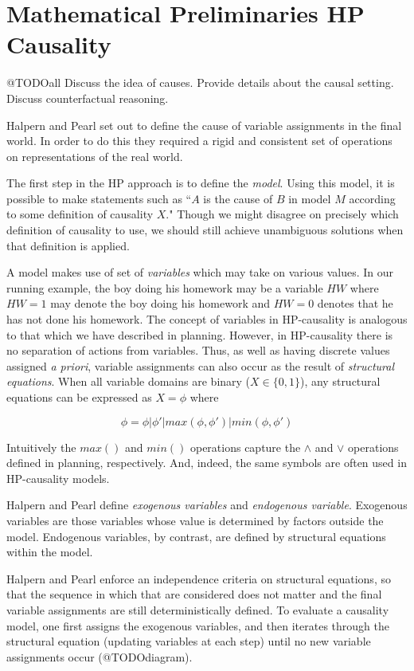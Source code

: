 \documentclass{article}
\theoremstyle{plain}
\theoremstyle{definition}
\begin{document}
\section{Mathematical Preliminaries HP Causality}

@TODOall  Discuss the idea of causes. Provide details about the causal setting. Discuss counterfactual reasoning.

Halpern and Pearl \cite{halpern2005causes} set out to define the cause of variable assignments in the final world. In order to do this they required a rigid and consistent set of operations on representations of the real world.

The first step in the HP approach is to define the \textit{model}. Using this model, it is possible to make statements such as ``$A$ is the cause of $B$ in  model $M$ according to some definition of causality $X$." Though we might disagree on precisely which definition of causality to use, we should still achieve unambiguous solutions when that definition is applied. 

A model makes use of set of \textit{variables} which may take on various values. In our running example, the boy doing his homework may be a variable $HW$ where $HW=1$ may denote the boy doing his homework and $HW=0$ denotes that he has not done his homework. The concept of variables in HP-causality is analogous to that which we have described in planning. However, in HP-causality there is no separation of actions from variables. Thus, as well as having discrete values assigned \textit{a priori}, variable assignments can also occur as the result of \textit{structural equations}. When all variable domains are binary ($X \in \{0,1\}$), any structural equations can be expressed as $X=\phi$ where

\[
\phi= \phi | \phi' | max(\phi, \phi') | min(\phi, \phi') 
\]

Intuitively the $max()$ and $min()$ operations capture the $\land$ and $\lor$ operations defined in planning, respectively. And, indeed, the same symbols are often used in HP-causality models.

Halpern and Pearl define \textit{exogenous variables} and \textit{endogenous variable}. Exogenous variables are those variables whose value is determined by factors outside the model. Endogenous variables, by contrast, are defined by structural equations within the model.

Halpern and Pearl enforce an independence criteria on structural equations, so that the sequence in which that are considered does not matter and the final variable assignments are still deterministically defined. To evaluate a causality model, one first assigns the exogenous variables, and then iterates through the structural equation (updating variables at each step) until no new variable assignments occur (@TODOdiagram).
\end{document}
